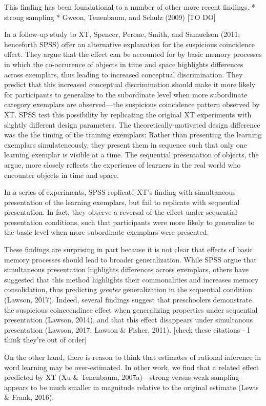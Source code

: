 \documentclass[english,floatsintext,man]{apa6}
\theoremstyle{definition}
\theoremstyle{definition}
\theoremstyle{remark}
\begin{document}
This finding has been foundational to a number of other more recent
findings. * strong sampling * Gweon, Tenenbaum, and Schulz (2009) {[}TO
DO{]}

In a follow-up study to XT, Spencer, Perone, Smith, and Samuelson (2011;
henceforth SPSS) offer an alternative explanation for the suspicious
coincidence effect. They argue that the effect can be accounted for by
basic memory processes in which the co-occurence of objects in time and
space highlights differences across exemplars, thus leading to increased
conceptual discrimination. They predict that this increased conceptual
discrimination should make it more likely for participants to generalize
to the subordinate level when more subordinate category exemplars are
observed---the suspicious coincidence pattern observed by XT. SPSS test
this possibility by replicating the original XT experiments with
slightly different design parameters. The theoretically-motivated design
difference was the the timing of the training exemplars: Rather than
presenting the learning exemplars simulateneously, they present them in
sequence such that only one learning exemplar is visible at a time. The
sequential presentation of objects, the argue, more closely reflects the
experience of learners in the real world who encounter objects in time
and space.

In a series of experiments, SPSS replicate XT's finding with
simultaneous presentation of the learning exemplars, but fail to
replicate with sequential presentation. In fact, they observe a reversal
of the effect under sequential presentation conditions, such that
participants were more likely to generalize to the basic level when more
subordinate exemplars were presented.

These findings are surprising in part because it is not clear that
effects of basic memory processes should lead to broader generalization.
While SPSS argue that simultaneous presentation highlights differences
across exemplars, others have suggested that this method highlights
their commonalities and increases memory consolidation, thus predicting
\emph{greater} generalization in the sequential condition (Lawson,
2017). Indeed, several findings suggest that preschoolers demonstrate
the suspicious coinccendince effect when generalizing properties under
sequential presentation (Lawson, 2014), and that this effect disappears
under simultanous presentation (Lawson, 2017; Lawson \& Fisher, 2011).
{[}check these citations - I think they're out of order{]}

On the other hand, there is reason to think that estimates of rational
inference in word learning may be over-estimated. In other work, we find
that a related effect predicted by XT (Xu \& Tenenbaum, 2007a)---strong
versus weak sampling---appears to be much smaller in magnitude relative
to the original estimate (Lewis \& Frank, 2016).
\end{document}
